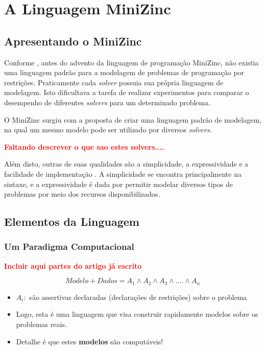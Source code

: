 \chapter{A Linguagem MiniZinc}


\section{Apresentando o MiniZinc}
\label{sc:minizinc}

Conforme \cite{mzntwds}, antes do advento da linguagem de programação MiniZinc, não existia uma linguagem padrão para a modelagem de problemas de programação por restrições. Praticamente cada \textit{solver} possuia sua própria linguagem de modelagem. Isto dificultava a tarefa de realizar experimentos para comparar o desempenho de diferentes \textit{solvers} para um determinado problema.

O MiniZinc surgiu com a proposta de criar uma linguagem padrão de modelagem, na qual um mesmo modelo pode ser utilizado por diversos \textit{solvers}. 

{\bf \textcolor{red}{Faltando descrever o que sao estes solvers....}}


Além disto, outras de suas qualidades são a simplicidade, a expressividade e a facilidade de implementação \cite{mzntwds}. A simplicidade se encontra principalmente na sintaxe, e a expressividade é dada por permitir modelar diversos tipos de problemas por meio dos recursos disponibilizados.

\section{Elementos da Linguagem}


\subsection{Um Paradigma Computacional}

{\bf \textcolor{red}{Incluir aqui partes do artigo já escrito}}


$$ Modelo + Dados = A_1 \wedge A_2 \wedge A_3 \wedge  ....  \wedge  A_n $$

\begin{itemize}
  \item 
 $A_i: $ são assertivas declaradas (declarações de restrições) sobre o problema

  \item  Logo, esta é uma linguagem  que visa construir rapidamente
modelos sobre os problemas reais.

  \item  Detalhe é que estes \textbf{modelos} são computáveis!


\end{itemize}




